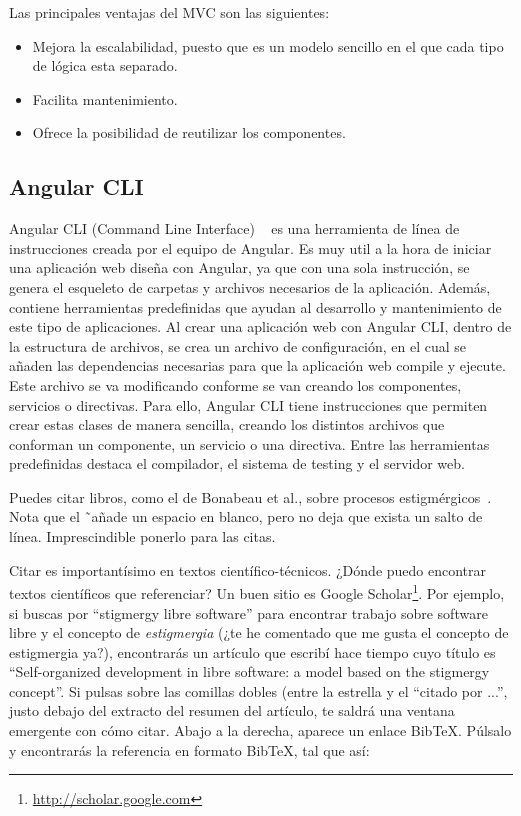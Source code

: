 \documentclass[a4paper, 12pt]{book}
\begin{document}
Las principales ventajas del MVC son las siguientes:

\begin{itemize}
  
  \item Mejora la escalabilidad, puesto que es un modelo sencillo en el que cada tipo de lógica esta separado.
 
  \item Facilita mantenimiento.

  \item Ofrece la posibilidad de reutilizar los componentes.

\end{itemize}

\subsection{Angular CLI} 
\label{sec:angularcli}

Angular CLI (Command Line Interface) ~\cite{angularcli} es una herramienta de línea de instrucciones creada por el equipo de Angular. Es muy util a la hora de iniciar una aplicación web diseña con Angular, ya que con una sola instrucción, se genera el esqueleto de carpetas y archivos necesarios de la aplicación. Además, contiene herramientas predefinidas que ayudan al desarrollo y mantenimiento de este tipo de aplicaciones. Al crear una aplicación web con Angular CLI, dentro de la estructura de archivos, se crea un archivo de configuración, en el cual se añaden las dependencias necesarias para que la aplicación web compile y ejecute. Este archivo se va modificando conforme se van creando los componentes, servicios o directivas. Para ello, Angular CLI tiene instrucciones que permiten crear estas clases de manera sencilla, creando los distintos archivos que conforman un componente, un servicio o una directiva. Entre las herramientas predefinidas destaca el compilador, el sistema de testing y el servidor web.



Puedes citar libros, como el de Bonabeau et al., sobre procesos estigmérgicos~\cite{bonabeau:_swarm}. 
Nota que el \~ \ añade un espacio en blanco, pero no deja que exista un salto de línea. 
Imprescindible ponerlo para las citas.

Citar es importantísimo en textos científico-técnicos. 
¿Dónde puedo encontrar textos científicos que referenciar?
Un buen sitio es Google Scholar\footnote{\url{http://scholar.google.com}}.
Por ejemplo, si buscas por ``stigmergy libre software'' para encontrar trabajo sobre software libre y el concepto de \emph{estigmergia} (¿te he comentado que me gusta el concepto de estigmergia ya?), encontrarás un artículo que escribí hace tiempo cuyo título es ``Self-organized development in libre software: a model based on the stigmergy concept''.
Si pulsas sobre las comillas dobles (entre la estrella y el ``citado por ...'', justo debajo del extracto del resumen del artículo, te saldrá una ventana emergente con cómo citar.
Abajo a la derecha, aparece un enlace BibTeX.
Púlsalo y encontrarás la referencia en formato BibTeX, tal que así:
\end{document}
